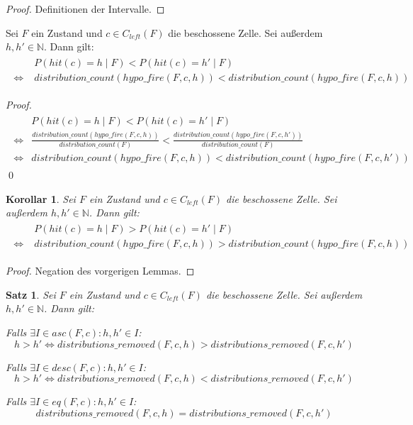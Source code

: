 \documentclass[a4paper,12pt]{llncs}
\newcommand{\N}{{\mathbb{N}}}
\numberwithin{equation}{section}
\newtheorem{satz}{Satz}
\newtheorem{korollar}{Korollar}
\begin{document}
\begin{proof}
Definitionen der Intervalle.
\end{proof}

\begin{lemma}
Sei $F$ ein Zustand und $c \in C_{left}(F)$ die beschossene Zelle.
Sei außerdem $h,h' \in \N$.
Dann gilt:
\begin{align}
\begin{split}
&P(hit(c)=h \mid F) < P(hit(c)=h' \mid F) \\
\Leftrightarrow \; &distribution\_count(hypo\_fire(F, c, h)) < distribution\_count(hypo\_fire(F, c, h))
\nonumber
\end{split}
\end{align}
\end{lemma}

\begin{proof}
\begin{align}
\begin{split}
&P(hit(c)=h \mid F) < P(hit(c)=h' \mid F) \\
\Leftrightarrow
&\frac{distribution\_count(hypo\_fire(F,c, h))}{distribution\_count(F)} < \frac{distribution\_count(hypo\_fire(F,c, h'))}{distribution\_count(F)} \\
\Leftrightarrow
&distribution\_count(hypo\_fire(F,c, h)) < distribution\_count(hypo\_fire(F,c, h'))
\nonumber
\end{split}
\end{align}
\qed
\end{proof}

\begin{korollar}
Sei $F$ ein Zustand und $c \in C_{left}(F)$ die beschossene Zelle.
Sei außerdem $h,h' \in \N$.
Dann gilt:
\begin{align}
\begin{split}
&P(hit(c)=h \mid F) > P(hit(c)=h' \mid F) \\
\Leftrightarrow \; &distribution\_count(hypo\_fire(F, c, h)) > distribution\_count(hypo\_fire(F, c, h))
\nonumber
\end{split}
\end{align}
\end{korollar}

\begin{proof}
Negation des vorgerigen Lemmas.
\end{proof}

\begin{satz}
Sei $F$ ein Zustand und $c \in C_{left}(F)$ die beschossene Zelle.
Sei außerdem $h,h' \in \N$.
Dann gilt:

Falls $\exists I \in asc(F, c) \colon h,h' \in I$:
\[
h > h' \Leftrightarrow distributions\_removed(F,c, h) > distributions\_removed(F,c, h')
\]

Falls $\exists I \in desc(F, c) \colon h,h' \in I$:
\[
h > h' \Leftrightarrow distributions\_removed(F,c, h) < distributions\_removed(F,c, h')
\]

Falls $\exists I \in eq(F, c) \colon h,h' \in I$:
\[
distributions\_removed(F,c, h) = distributions\_removed(F,c, h')
\]
\end{satz}
\end{document}
